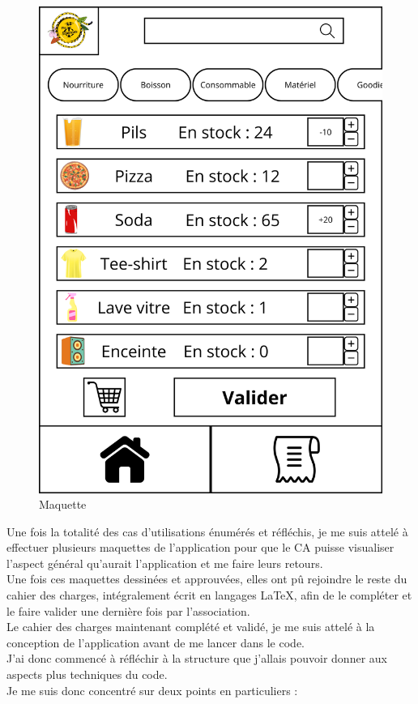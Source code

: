 \documentclass[11pt, twoside]{article}
\begin{document}
\begin{figure}
    \includegraphics[width=0.8\linewidth]{../cachier des charges/Maquette_appli/Home_page.png} 
    \caption{Maquette}
    \label{fig:maquette}
\end{figure}
Une fois la totalité des cas d'utilisations énumérés et réfléchis, je me suis attelé à effectuer plusieurs maquettes de l'application pour que le CA puisse visualiser l'aspect général qu'aurait l'application et me faire leurs retours.\\
Une fois ces maquettes dessinées et approuvées, elles ont pû rejoindre le reste du cahier des charges, intégralement écrit en langages \LaTeX, afin de le compléter et le faire valider une dernière fois par l'association.
\vspace*{0.2cm}\\
Le cahier des charges maintenant complété et validé, je me suis attelé à la conception de l'application avant de me lancer dans le code.\\
J'ai donc commencé à réfléchir à la structure que j'allais pouvoir donner aux aspects plus techniques du code.\\
Je me suis donc concentré sur deux points en particuliers :
\end{document}
